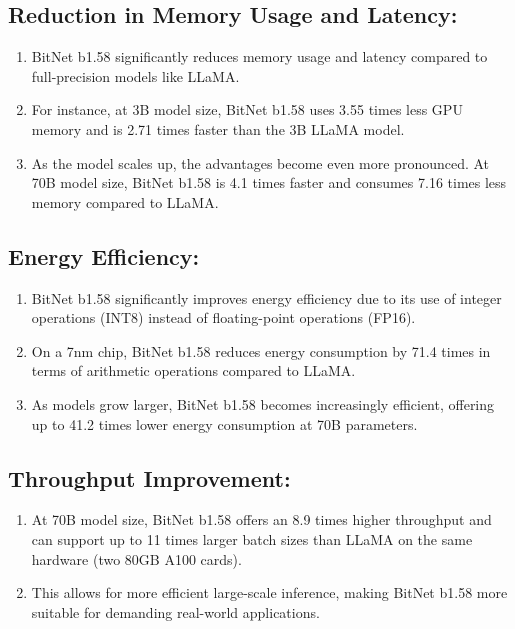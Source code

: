 \documentclass{report}
\begin{document}
	\subsection{Reduction in Memory Usage and Latency:}
	\begin{enumerate}
		\item 
		BitNet b1.58 significantly reduces memory usage and latency compared to full-precision models like LLaMA.
		
		\item 
		For instance, at 3B model size, BitNet b1.58 uses 3.55 times less GPU memory and is 2.71 times faster than the 3B LLaMA model.
		
		\item 
		As the model scales up, the advantages become even more pronounced. At 70B model size, BitNet b1.58 is 4.1 times faster and consumes 7.16 times less memory compared to LLaMA.
	\end{enumerate}
	
	\subsection{Energy Efficiency:}
	\begin{enumerate}
		\item 
		BitNet b1.58 significantly improves energy efficiency due to its use of integer operations (INT8) instead of floating-point operations (FP16).
		
		\item 
		On a 7nm chip, BitNet b1.58 reduces energy consumption by 71.4 times in terms of arithmetic operations compared to LLaMA.
		
		\item 
		As models grow larger, BitNet b1.58 becomes increasingly efficient, offering up to 41.2 times lower energy consumption at 70B parameters.
	\end{enumerate}
	
	\subsection{Throughput Improvement:}
	\begin{enumerate}
		\item 
		At 70B model size, BitNet b1.58 offers an 8.9 times higher throughput and can support up to 11 times larger batch sizes than LLaMA on the same hardware (two 80GB A100 cards).
		
		\item 
		This allows for more efficient large-scale inference, making BitNet b1.58 more suitable for demanding real-world applications.
	\end{enumerate}
	
\end{document}
